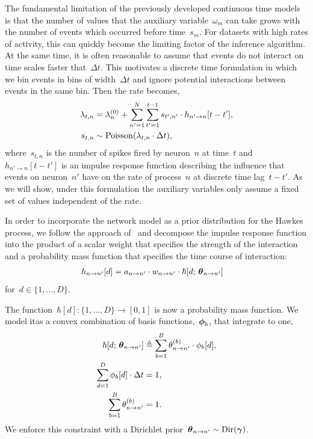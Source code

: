 The fundamental limitation of the previously developed continuous time
models is that the number of values that the auxiliary
variable~$\omega_m$ can take grows with the number of events which
occurred before time~$s_{m}$. For datasets with high rates of
activity, this can quickly become the limiting factor of the inference
algorithm.  At the same time, it is often reasonable to assume that
events do not interact on time scales faster that~$\Delta t$. This
motivates a discrete time formulation in which we bin events in bins
of width~$\Delta t$ and ignore potential interactions between events
in the same bin. Then the rate becomes,
\begin{align}
\label{eq:disc_hawkes_rate}
\lambda_{t,n} &= \lambda_n^{(0)} +
\sum_{n' = 1}^N \sum_{t'=1}^{t-1} s_{t',n'} \cdot h_{n' \to n}[t-t'], \\
s_{t,n} &\sim \mathrm{Poisson}(\lambda_{t,n} \cdot \Delta t),
\end{align}
where~$s_{t,n}$ is the number of spikes fired by neuron~$n$ at time~$t$
and~${h_{n' \to n}[t-t']}$ is an impulse response function describing
the influence that events on neuron~$n'$ have on the
rate of process~$n$ at discrete time lag~${t-t'}$. As we will show,
under this formulation the auxiliary variables only assume a fixed set
of values independent of the rate.

In order to incorporate the network model as a prior distribution for
the Hawkes process, we follow the approach of~\citet{Linderman-2014}
and decompose the impulse response function into the product of a
scalar weight that specifies the strength of the interaction and a
probability mass function that specifies the time course of
interaction:
\begin{align*}
  h_{n \to n'}[d]
  &= a_{n \to n'} \cdot w_{n \to n'} \cdot \hbar[d; \, \boldsymbol{\theta}_{n \to n'}] 
\end{align*}
for~${d \in\{1,\ldots,D\}}$.  

The function~${\hbar[d]: \{1, \ldots, D\} \to
  [0,1]}$ is now a probability mass function.  We model itas a convex
combination of basis functions,~$\boldsymbol{\phi}_b$, that integrate to one,
\begin{align*}
  \hbar[d; \, \boldsymbol{\theta}_{n \to n'}]
  &\triangleq \sum_{b=1}^B \theta_{n \to n'}^{(b)} \cdot \phi_b[d], \\
  \sum_{d=1}^D \phi_b[d] \cdot \Delta t  &= 1, \\
  \sum_{b=1}^B \theta_{n \to n'}^{(b)} &= 1.
\end{align*}
We enforce this constraint with a Dirichlet
prior~${\boldsymbol{\theta}_{n \to n'} \sim \mathrm{Dir}(\boldsymbol{\gamma})}$.

